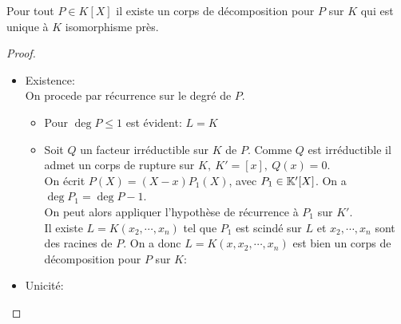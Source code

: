 \begin{theorem}
	Pour tout $P\in K[X]$ il existe un corps de décomposition pour $P$ sur $K$ qui est unique à $K$ isomorphisme près.
\end{theorem}

\begin{proof}
	\begin{itemize}
		\item Existence:\\
		      On procede par récurrence sur le degré de $P$.
		      \begin{itemize}
			      \item Pour $\deg P \leq 1$ est évident: $L = K$
			      \item Soit $Q$ un facteur irréductible sur $K$ de $P$.
			            Comme $Q$ est irréductible il admet un corps de rupture sur $K, \ K' = [x], \ Q(x) = 0$.\\
			            On écrit $P(X) = (X-x)P_1(X)$, avec $P_1 \in \mathbb{K}'[X]$. On a $\deg P_1 = \deg P -1$.\\
			            On peut alors appliquer l'hypothèse de récurrence à $P_1$ sur $K'$.\\
			            Il existe $L = K(x_2, \cdots,  x_n)$ tel que $P_1$ est scindé sur $L$ et
			            $x_2, \cdots, x_n$ sont des racines de $P$. On a donc $L = K(x, x_2, \cdots, x_n)$ est bien un
			            corps de décomposition pour $P$ sur $K$:
		      \end{itemize}
		\item Unicité: %

	\end{itemize}

\end{proof}
